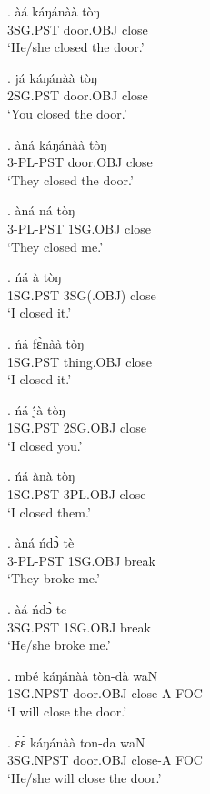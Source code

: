 \documentclass{assets/fieldnotes}
\begin{document}
\exg.
àá        káŋánàà    tòŋ   \\
3SG.PST   door.OBJ   close \\%
`He/she closed the door.'

\exg.
já        káŋánàà    tòŋ   \\
2SG.PST   door.OBJ   close \\%
`You closed the door.'

\exg.
àná       káŋánàà    tòŋ   \\
3-PL-PST   door.OBJ   close \\%
`They closed the door.'

\exg.
àná       ná        tòŋ   \\
3-PL-PST   1SG.OBJ   close \\%
`They closed me.'

\exg.
ńá        à           tòŋ   \\
1SG.PST   3SG(.OBJ)   close \\%
`I closed it.'

\exg.
ńá        fɛ̀nàà       tòŋ   \\
1SG.PST   thing.OBJ   close \\%
`I closed it.'

\exg.
ńá        j́à        tòŋ   \\
1SG.PST   2SG.OBJ   close \\%
`I closed you.'

\exg.
ńá        ànà       tòŋ   \\
1SG.PST   3PL.OBJ   close \\%
`I closed them.'

\exg.
àná       ńdɔ̀       tè    \\
3-PL-PST   1SG.OBJ   break \\%
`They broke me.'

\exg.
àá        ńdɔ̀       te    \\
3SG.PST   1SG.OBJ   break \\%
`He/she broke me.'

\exg.
mbé        káŋánàà    tòn-dà    waN \\
1SG.NPST   door.OBJ   close-A   FOC \\%
`I will close the door.'

\exg.
ɛ̀ɛ̀         káŋánàà    ton-da    waN \\
3SG.NPST   door.OBJ   close-A   FOC \\%
`He/she will close the door.' \label{16309}
\end{document}

